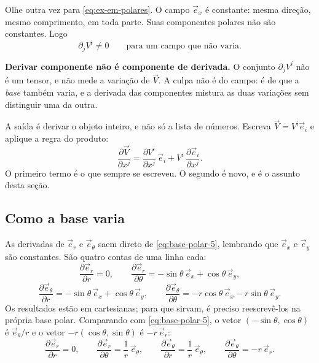 \documentclass[12pt,a4paper,oneside]{book}
\theoremstyle{rgplain}
\theoremstyle{rgremark}
\begin{document}
Olhe outra vez para \eqref{eq:ex-em-polares}. O campo $\vec e_x$ é constante:
mesma direção, mesmo comprimento, em toda parte. Suas componentes polares
não são constantes. Logo
\[
  \partial_j V^i \ne 0
  \qquad\text{para um campo que não varia.}
\]

\begin{central}
\textbf{Derivar componente não é componente de derivada.} O conjunto
$\partial_jV^i$ não é um tensor, e não mede a variação de $\vec V$. A culpa
não é do campo: é de que a \emph{base} também varia, e a derivada das
componentes mistura as duas variações sem distinguir uma da outra.
\end{central}

A saída é derivar o objeto inteiro, e não só a lista de números. Escreva
$\vec V=V^i\vec e_i$ e aplique a regra do produto:
\begin{equation}
  \frac{\partial\vec V}{\partial x^j}
  =\frac{\partial V^i}{\partial x^j}\,\vec e_i
  +V^i\,\frac{\partial\vec e_i}{\partial x^j} .
  \label{eq:regra-produto}
\end{equation}
O primeiro termo é o que sempre se escreveu. O segundo é novo, e é o assunto
desta seção.

\subsection*{Como a base varia}

As derivadas de $\vec e_r$ e $\vec e_\theta$ saem direto de
\eqref{eq:base-polar-5}, lembrando que $\vec e_x$ e $\vec e_y$ são constantes.
São quatro contas de uma linha cada:
\[
  \frac{\partial\vec e_r}{\partial r}=0 ,
  \qquad
  \frac{\partial\vec e_r}{\partial\theta}
  =-\sin\theta\,\vec e_x+\cos\theta\,\vec e_y ,
\]
\[
  \frac{\partial\vec e_\theta}{\partial r}
  =-\sin\theta\,\vec e_x+\cos\theta\,\vec e_y ,
  \qquad
  \frac{\partial\vec e_\theta}{\partial\theta}
  =-r\cos\theta\,\vec e_x-r\sin\theta\,\vec e_y .
\]
Os resultados estão em cartesianas; para que sirvam, é preciso reescrevê-los
na própria base polar. Comparando com \eqref{eq:base-polar-5}, o vetor
$(-\sin\theta,\cos\theta)$ é $\vec e_\theta/r$ e o vetor
$-r(\cos\theta,\sin\theta)$ é $-r\,\vec e_r$:
\begin{equation}
  \frac{\partial\vec e_r}{\partial r}=0 ,
  \qquad
  \frac{\partial\vec e_r}{\partial\theta}=\frac1r\,\vec e_\theta ,
  \qquad
  \frac{\partial\vec e_\theta}{\partial r}=\frac1r\,\vec e_\theta ,
  \qquad
  \frac{\partial\vec e_\theta}{\partial\theta}=-r\,\vec e_r .
  \label{eq:derivadas-base}
\end{equation}
\end{document}
